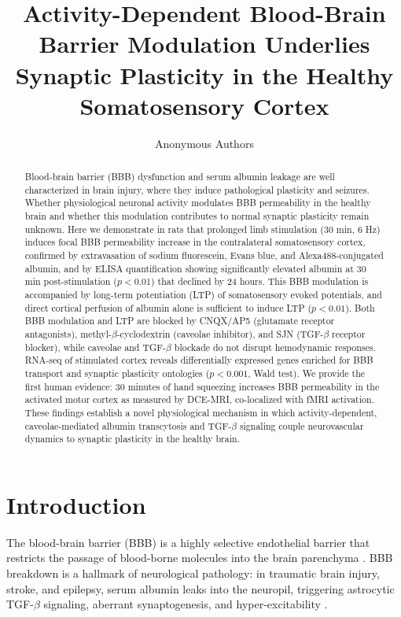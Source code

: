 \documentclass[11pt]{article}
\title{Activity-Dependent Blood-Brain Barrier Modulation Underlies Synaptic Plasticity in the Healthy Somatosensory Cortex}
\author{Anonymous Authors}
\date{}
\begin{document}
\maketitle

\begin{abstract}
Blood-brain barrier (BBB) dysfunction and serum albumin leakage are well characterized in brain injury, where they induce pathological plasticity and seizures. Whether physiological neuronal activity modulates BBB permeability in the healthy brain and whether this modulation contributes to normal synaptic plasticity remain unknown. Here we demonstrate in rats that prolonged limb stimulation (30 min, 6 Hz) induces focal BBB permeability increase in the contralateral somatosensory cortex, confirmed by extravasation of sodium fluorescein, Evans blue, and Alexa488-conjugated albumin, and by ELISA quantification showing significantly elevated albumin at 30 min post-stimulation ($p < 0.01$) that declined by 24 hours. This BBB modulation is accompanied by long-term potentiation (LTP) of somatosensory evoked potentials, and direct cortical perfusion of albumin alone is sufficient to induce LTP ($p < 0.01$). Both BBB modulation and LTP are blocked by CNQX/AP5 (glutamate receptor antagonists), methyl-$\beta$-cyclodextrin (caveolae inhibitor), and SJN (TGF-$\beta$ receptor blocker), while caveolae and TGF-$\beta$ blockade do not disrupt hemodynamic responses. RNA-seq of stimulated cortex reveals differentially expressed genes enriched for BBB transport and synaptic plasticity ontologies ($p < 0.001$, Wald test). We provide the first human evidence: 30 minutes of hand squeezing increases BBB permeability in the activated motor cortex as measured by DCE-MRI, co-localized with fMRI activation. These findings establish a novel physiological mechanism in which activity-dependent, caveolae-mediated albumin transcytosis and TGF-$\beta$ signaling couple neurovascular dynamics to synaptic plasticity in the healthy brain.
\end{abstract}

\section{Introduction}

The blood-brain barrier (BBB) is a highly selective endothelial barrier that restricts the passage of blood-borne molecules into the brain parenchyma \citep{abbott2010structure, zlokovic2008blood}. BBB breakdown is a hallmark of neurological pathology: in traumatic brain injury, stroke, and epilepsy, serum albumin leaks into the neuropil, triggering astrocytic TGF-$\beta$ signaling, aberrant synaptogenesis, and hyper-excitability \citep{friedman2009blood, ivens2007tgf, seiffert2004lasting, weissberg2015albumin}.
\end{document}
